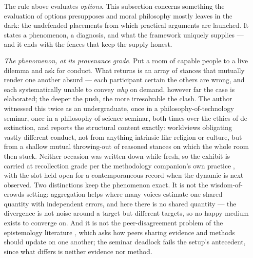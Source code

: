 \documentclass[11pt]{article}
\numberwithin{equation}{section}
\theoremstyle{plain}
\theoremstyle{definition}
\theoremstyle{remark}
\begin{document}
The rule above evaluates \emph{options}. This subsection concerns
something the evaluation of options presupposes and moral philosophy
mostly leaves in the dark: the undefended placements from which
practical arguments are launched. It states a phenomenon, a diagnosis,
and what the framework uniquely supplies --- and it ends with the
fences that keep the supply honest.

\emph{The phenomenon, at its provenance grade.} Put a room of capable
people to a live dilemma and ask for conduct. What returns is an array
of stances that mutually render one another absurd --- each participant
certain the others are wrong, and each systematically unable to convey
\emph{why} on demand, however far the case is elaborated; the deeper
the push, the more irresolvable the clash. The author witnessed this
twice as an undergraduate, once in a philosophy-of-technology
seminar, once in a philosophy-of-science seminar, both times over the
ethics of de-extinction, and reports the structural content
exactly: worldviews obligating vastly different conduct, not from
anything intrinsic like religion or culture, but from a shallow mutual
throwing-out of reasoned stances on which the whole room then stuck.
Neither occasion was written down while fresh, so the exhibit is
carried at recollection grade per the methodology companion's own
practice \cite{Ben26Method}, with the slot held open for a
contemporaneous record when the dynamic is next observed. Two
distinctions keep the phenomenon exact. It is not the
wisdom-of-crowds setting: aggregation helps where many voices estimate
one shared quantity with independent errors, and here there is no
shared quantity --- the divergence is not noise around a target but
different targets, so no happy medium exists to converge on. And it is
not the peer-disagreement problem of the epistemology literature
\cite{Chr07}, which asks how peers sharing evidence and methods should
update on one another; the seminar deadlock fails the setup's
antecedent, since what differs is neither evidence nor method.
\end{document}
